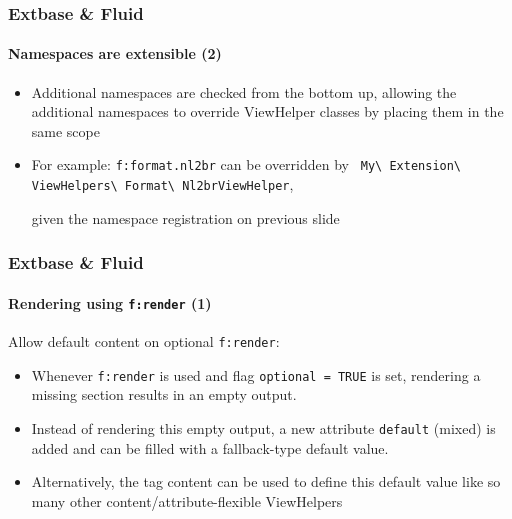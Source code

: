 \begin{frame}[fragile]
	\frametitle{Extbase \& Fluid}
	\framesubtitle{Namespaces are extensible (2)}

	\begin{itemize}

		\item Additional namespaces are checked from the bottom up, allowing the
			additional namespaces to override ViewHelper classes by placing them in
			the same scope

		\item For example: \texttt{f:format.nl2br} can be overridden by
			\texttt{
				My\textbackslash
				Extension\textbackslash
				ViewHelpers\textbackslash
				Format\textbackslash
				Nl2brViewHelper},

				given the namespace registration on previous slide

	\end{itemize}

\end{frame}


\begin{frame}[fragile]
	\frametitle{Extbase \& Fluid}
	\framesubtitle{Rendering using \texttt{f:render} (1)}

	Allow default content on optional \texttt{f:render}:

	\begin{itemize}

		\item Whenever \texttt{f:render} is used and flag \texttt{optional = TRUE}
			is set, rendering a missing section results in an empty output.

		\item Instead of rendering this empty output, a new attribute \texttt{default}
			(mixed) is added and can be filled with a fallback-type default value.

		\item Alternatively, the tag content can be used to define this default value
			like so many other content/attribute-flexible ViewHelpers

	\end{itemize}

\end{frame}

